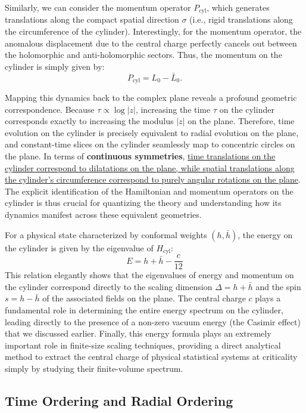Similarly, we can consider the momentum operator \(P_{\text{cyl}}\), which generates translations along the compact spatial direction \(\sigma\) (i.e., rigid translations along the circumference of the cylinder). Interestingly, for the momentum operator, the anomalous displacement due to the central charge perfectly cancels out between the holomorphic and anti-holomorphic sectors. Thus, the momentum on the cylinder is simply given by:
\[
    P_{\text{cyl}} = L_0 - \bar{L}_0.
\]

Mapping this dynamics back to the complex plane reveals a profound geometric correspondence. Because \(\tau \propto \log |z|\), increasing the time \(\tau\) on the cylinder corresponds exactly to increasing the modulus \(|z|\) on the plane. Therefore, time evolution on the cylinder is precisely equivalent to radial evolution on the plane, and constant-time slices on the cylinder seamlessly map to concentric circles on the plane. In terms of \textbf{continuous symmetries}, \uline{time translations on the cylinder correspond to dilatations on the plane, while spatial translations along the cylinder's circumference correspond to purely angular rotations on the plane}. The explicit identification of the Hamiltonian and momentum operators on the cylinder is thus crucial for quantizing the theory and understanding how its dynamics manifest across these equivalent geometries.

For a physical state characterized by conformal weights \((h, \bar{h})\), the energy on the cylinder is given by the eigenvalue of \(H_{\text{cyl}}\):
\[
    E = h + \bar{h} - \frac{c}{12}
\]
This relation elegantly shows that the eigenvalues of energy and momentum on the cylinder correspond directly to the scaling dimension \(\Delta = h + \bar{h}\) and the spin \(s = h - \bar{h}\) of the associated fields on the plane. The central charge \(c\) plays a fundamental role in determining the entire energy spectrum on the cylinder, leading directly to the presence of a non-zero vacuum energy (the Casimir effect) that we discussed earlier. Finally, this energy formula plays an extremely important role in finite-size scaling techniques, providing a direct analytical method to extract the central charge of physical statistical systems at criticality simply by studying their finite-volume spectrum.

\subsection{Time Ordering and Radial Ordering}

